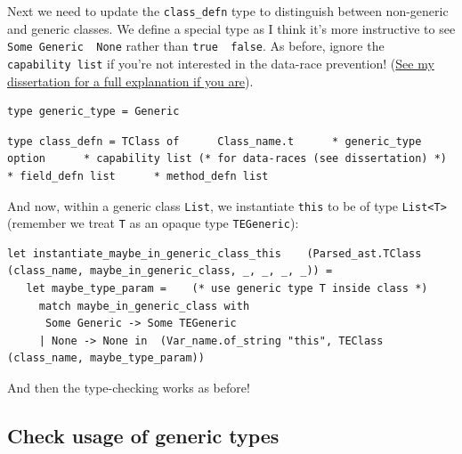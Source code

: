 Next we need to update the \texttt{class\_defn} type to distinguish
between non-generic and generic classes. We define a special type as I
think it's more instructive to see
\texttt{Some\ Generic\ \textbar{}\ None} rather than
\texttt{true\ \textbar{}\ false}. As before, ignore the
\texttt{capability\ list} if you're not interested in the data-race
prevention!
(\href{https://github.com/mukul-rathi/bolt-dissertation/blob/master/dissertation.pdf}{See
my dissertation for a full explanation if you are}).

%

\begin{lstlisting}[language=caml,caption={ast\_types.ml}]
type generic_type = Generic
\end{lstlisting}

%

\begin{lstlisting}[language=caml,caption={{parsed\_ast.ml}}]
type class_defn = TClass of      Class_name.t      * generic_type option      * capability list (* for data-races (see dissertation) *)      * field_defn list      * method_defn list
\end{lstlisting}

And now, within a generic class \texttt{List}, we instantiate
\texttt{this} to be of type \texttt{List\textless{}T\textgreater{}}
(remember we treat \texttt{T} as an opaque type \texttt{TEGeneric}):
%
%

\begin{lstlisting}[language=caml,caption={type\_generics.ml}]
let instantiate_maybe_in_generic_class_this    (Parsed_ast.TClass (class_name, maybe_in_generic_class, _, _, _, _)) =  
   let maybe_type_param =    (* use generic type T inside class *)    
     match maybe_in_generic_class with 
      Some Generic -> Some TEGeneric 
     | None -> None in  (Var_name.of_string "this", TEClass (class_name, maybe_type_param))
\end{lstlisting}

And then the type-checking works as before!

\hypertarget{check-usage-of-generic-types}{%
\subsection{\texorpdfstring{\protect\hyperlink{check-usage-of-generic-types}{}Check
usage of generic
types}{Check usage of generic types}}\label{check-usage-of-generic-types}}

